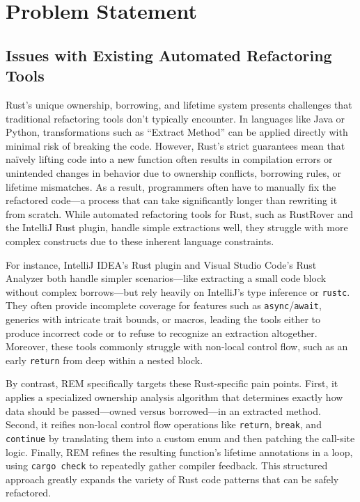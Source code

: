 \section{Problem Statement}
\label{sec:problem-statement}

\subsection{Issues with Existing Automated Refactoring Tools}
\label{sec:issues-existing-tools}

Rust's unique ownership, borrowing, and lifetime system presents challenges that
traditional refactoring tools don't typically encounter. In languages like Java
or Python, transformations such as ``Extract Method'' can be applied directly
with minimal risk of breaking the code. However, Rust's strict guarantees mean
that naïvely lifting code into a new function often results in compilation
errors or unintended changes in behavior due to ownership conflicts, borrowing
rules, or lifetime mismatches. As a result, programmers often have to manually
fix the refactored code—a process that can take significantly longer than
rewriting it from scratch. While automated refactoring tools for Rust, such as
RustRover and the IntelliJ Rust plugin, handle simple extractions well, they
struggle with more complex constructs due to these inherent language
constraints.

For instance, IntelliJ IDEA's Rust plugin and Visual Studio Code's Rust Analyzer
both handle simpler scenarios—like extracting a small code block without complex
borrows—but rely heavily on IntelliJ's type inference or \texttt{rustc}. They
often provide incomplete coverage for features such as
\texttt{async}/\texttt{await}, generics with intricate trait bounds, or macros,
leading the tools either to produce incorrect code or to refuse to recognize an
extraction altogether. Moreover, these tools commonly struggle with non-local
control flow, such as an early \texttt{return} from deep within a nested block.

By contrast, REM specifically targets these Rust-specific pain points. First, it
applies a specialized ownership analysis algorithm that determines exactly how
data should be passed—owned versus borrowed—in an extracted method. Second, it
reifies non-local control flow operations like \texttt{return}, \texttt{break},
and \texttt{continue} by translating them into a custom enum and then patching
the call-site logic. Finally, REM refines the resulting function's lifetime
annotations in a loop, using \texttt{cargo check} to repeatedly gather compiler
feedback. This structured approach greatly expands the variety of Rust code
patterns that can be safely refactored.

